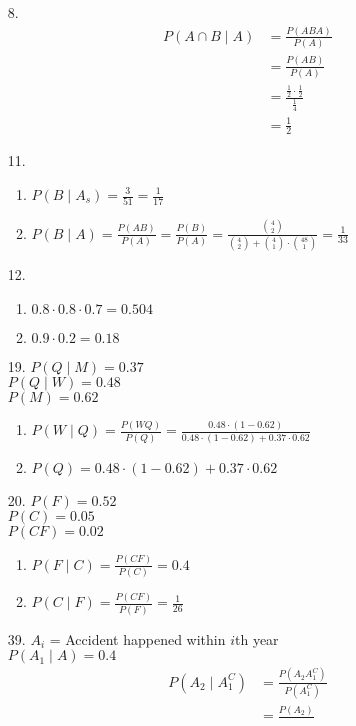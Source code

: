 \documentclass{article}
\begin{document}
\begin{itemize}
\item [8.]
  \begin{equation*}
    \begin{split}
      P(A \cap B \mid A)
      &= \frac{P(ABA)}{P(A)}\\
      &= \frac{P(AB)}{P(A)}\\
      &= \frac{\frac{1}{2}\cdot \frac{1}{2}}{\frac{1}{4}}\\
      &= \frac{1}{2}
    \end{split}
  \end{equation*}
\item [11.]
  \begin{enumerate}[label=(\alph*)]
  \item \(P(B \mid A_s) = \frac{3}{51} = \frac{1}{17}\)
  \item \(P(B \mid A) = \frac{P(AB)}{P(A)} = \frac{P(B)}{P(A)} = \frac{{4 \choose 2}}{{4 \choose 2} + {4 \choose 1} \cdot {48 \choose 1}} = \frac{1}{33}\)
  \end{enumerate}
\item [12.]
  \begin{enumerate}[label=(\alph*)]
  \item $0.8 \cdot 0.8 \cdot 0.7 = 0.504$
  \item $0.9 \cdot 0.2 = 0.18$
  \end{enumerate}
\item [19.]
  $P(Q \mid M) = 0.37$\\
  $P(Q \mid W) = 0.48$\\
  $P(M) = 0.62$
  \begin{enumerate}[label=(\alph*)]
  \item $P(W \mid Q) = \frac{P(WQ)}{P(Q)} = \frac{0.48 \cdot (1-0.62)}{0.48 \cdot (1-0.62) + 0.37 \cdot 0.62}$
  \item $P(Q) = 0.48 \cdot (1-0.62) + 0.37 \cdot 0.62$
  \end{enumerate}
\item [20.]
  $P(F) = 0.52$\\
  $P(C) = 0.05$\\
  $P(CF) = 0.02$
  \begin{enumerate}[label=(\alph*)]
  \item $P(F \mid C) = \frac{P(CF)}{P(C)} = 0.4$
  \item $P(C \mid F) = \frac{P(CF)}{P(F)} = \frac{1}{26}$
  \end{enumerate}
\item [39.]
  $A_i$ = Accident happened within $i$th year\\
  $P(A_1 \mid A) = 0.4$\\
  \begin{equation*}
    \begin{split}
      P(A_2 \mid A_1^C)
      &= \frac{P(A_2A_1^C)}{P(A_1^C)}\\
      &= \frac{P(A_2)}{}
    \end{split}
  \end{equation*}

  
\end{itemize}
\end{document}
